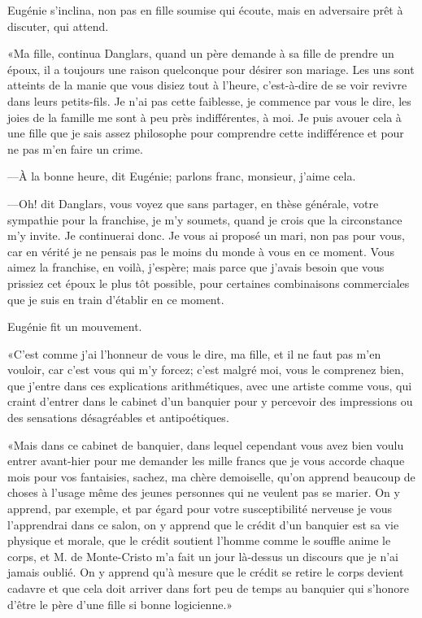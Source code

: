 Eugénie s'inclina, non pas en fille soumise qui écoute, mais en adversaire prêt à discuter, qui attend. 

«Ma fille, continua Danglars, quand un père demande à sa fille de prendre un époux, il a toujours une raison quelconque pour désirer son mariage. Les uns sont atteints de la manie que vous disiez tout à l'heure, c'est-à-dire de se voir revivre dans leurs petits-fils. Je n'ai pas cette faiblesse, je commence par vous le dire, les joies de la famille me sont à peu près indifférentes, à moi. Je puis avouer cela à une fille que je sais assez philosophe pour comprendre cette indifférence et pour ne pas m'en faire un crime. 

—À la bonne heure, dit Eugénie; parlons franc, monsieur, j'aime cela. 

—Oh! dit Danglars, vous voyez que sans partager, en thèse générale, votre sympathie pour la franchise, je m'y soumets, quand je crois que la circonstance m'y invite. Je continuerai donc. Je vous ai proposé un mari, non pas pour vous, car en vérité je ne pensais pas le moins du monde à vous en ce moment. Vous aimez la franchise, en voilà, j'espère; mais parce que j'avais besoin que vous prissiez cet époux le plus tôt possible, pour certaines combinaisons commerciales que je suis en train d'établir en ce moment. 

Eugénie fit un mouvement. 

«C'est comme j'ai l'honneur de vous le dire, ma fille, et il ne faut pas m'en vouloir, car c'est vous qui m'y forcez; c'est malgré moi, vous le comprenez bien, que j'entre dans ces explications arithmétiques, avec une artiste comme vous, qui craint d'entrer dans le cabinet d'un banquier pour y percevoir des impressions ou des sensations désagréables et antipoétiques. 

«Mais dans ce cabinet de banquier, dans lequel cependant vous avez bien voulu entrer avant-hier pour me demander les mille francs que je vous accorde chaque mois pour vos fantaisies, sachez, ma chère demoiselle, qu'on apprend beaucoup de choses à l'usage même des jeunes personnes qui ne veulent pas se marier. On y apprend, par exemple, et par égard pour votre susceptibilité nerveuse je vous l'apprendrai dans ce salon, on y apprend que le crédit d'un banquier est sa vie physique et morale, que le crédit soutient l'homme comme le souffle anime le corps, et M. de Monte-Cristo m'a fait un jour là-dessus un discours que je n'ai jamais oublié. On y apprend qu'à mesure que le crédit se retire le corps devient cadavre et que cela doit arriver dans fort peu de temps au banquier qui s'honore d'être le père d'une fille si bonne logicienne.» 

